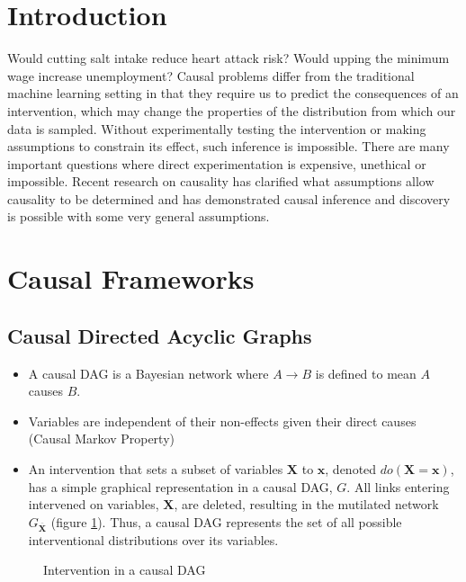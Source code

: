 \documentclass[20pt]{extreport}
\begin{document}
\section*{Introduction}

Would cutting salt intake reduce heart attack risk? Would upping the minimum wage increase unemployment? Causal problems differ from the traditional machine learning setting in that they require us to predict the consequences of an intervention, which may change the properties of the distribution from which our data is sampled. Without experimentally testing the intervention or making assumptions to constrain its effect, such inference is impossible. There are many important questions where direct experimentation is expensive, unethical or impossible. Recent research on causality has clarified what assumptions allow causality to be determined and has demonstrated causal inference and discovery is possible with some very general assumptions.   

\section*{Causal Frameworks}
\subsection*{Causal Directed Acyclic Graphs}
\begin{itemize}
\item A causal DAG is a Bayesian network where $A \rightarrow B$ is defined to mean $A$ causes $B$.
\item Variables are independent of their non-effects given their direct causes (Causal Markov Property)
\item An intervention that sets a subset of variables $\boldsymbol{X}$ to $\boldsymbol{x}$, denoted $do(\boldsymbol{X} = \boldsymbol{x})$, has a simple graphical representation in a causal DAG, $G$. All links entering intervened on variables, $\boldsymbol{X}$, are deleted, resulting in the mutilated network $G_{\overline{\boldsymbol{X}}}$ (figure \ref{fig:intervention}). Thus, a causal DAG represents the set of all possible interventional distributions over its variables.
\end{itemize}

\begin{figure}
\caption{Intervention in a causal DAG}
\label{fig:intervention}
\centering
{}
\end{figure}
\end{document}
